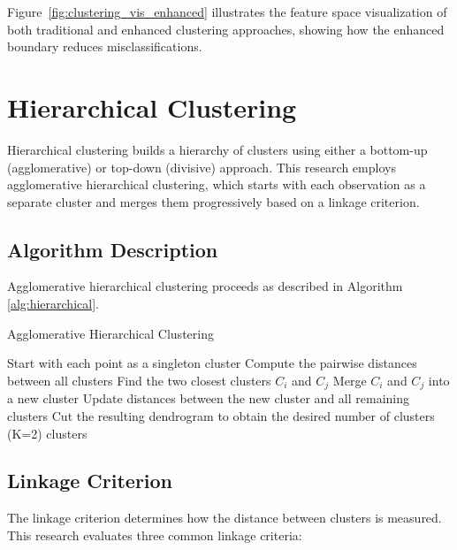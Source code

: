 Figure~\ref{fig:clustering_vis_enhanced} illustrates the feature space visualization of both traditional and enhanced clustering approaches, showing how the enhanced boundary reduces misclassifications.

\section{\texorpdfstring{\large\textbf{Hierarchical Clustering}}{Hierarchical Clustering}}
\begin{tcolorbox}[enhanced, colback=orange!5, colframe=orange!75!black, title=About Hierarchical Clustering, sharp corners]
Hierarchical clustering builds a hierarchy of clusters using either a bottom-up (agglomerative) or top-down (divisive) approach. This research employs agglomerative hierarchical clustering, which starts with each observation as a separate cluster and merges them progressively based on a linkage criterion.
\end{tcolorbox}

\subsection{Algorithm Description}

Agglomerative hierarchical clustering proceeds as described in Algorithm \ref{alg:hierarchical}.

\begin{algorithm}
\caption{Agglomerative Hierarchical Clustering}
\label{alg:hierarchical}
\begin{algorithmic}[1]
    \State Start with each point as a singleton cluster
    \State Compute the pairwise distances between all clusters
        \State Find the two closest clusters $C_i$ and $C_j$
        \State Merge $C_i$ and $C_j$ into a new cluster
        \State Update distances between the new cluster and all remaining clusters
    \EndWhile
    \State Cut the resulting dendrogram to obtain the desired number of clusters (K=2)
    \State \Return clusters
\EndProcedure
\end{algorithmic}
\end{algorithm}

\subsection{Linkage Criterion}

The linkage criterion determines how the distance between clusters is measured. This research evaluates three common linkage criteria:

